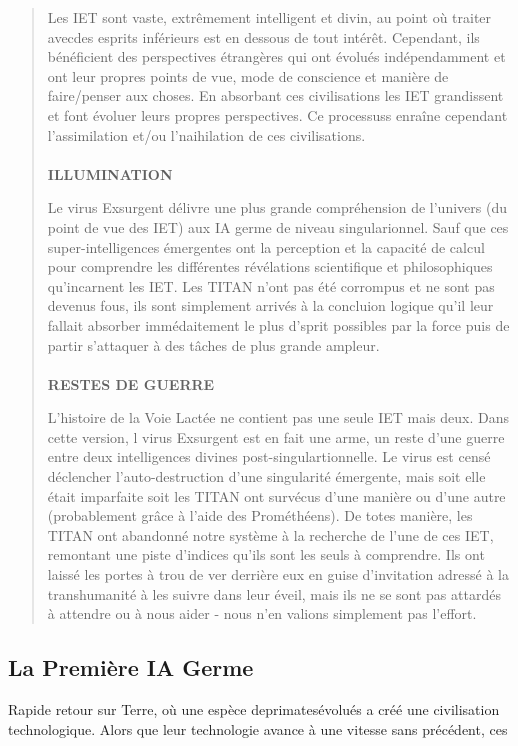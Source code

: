 \begin{quotation}
Les IET sont vaste, extrêmement intelligent et divin, au point où traiter avecdes esprits inférieurs est en dessous de tout intérêt. Cependant, ils bénéficient des perspectives étrangères qui ont évolués indépendamment et ont leur propres points de vue, mode de conscience et manière de faire/penser aux choses. En absorbant ces civilisations les IET grandissent et font évoluer leurs propres perspectives. Ce processuss enraîne cependant l'assimilation et/ou l'naihilation de ces civilisations. \\ \\ \textbf{ILLUMINATION} 

Le virus Exsurgent délivre une plus grande compréhension de l'univers (du point de vue des IET) aux IA germe de niveau singularionnel. Sauf que ces super-intelligences émergentes ont la perception et la capacité de calcul pour comprendre les différentes révélations scientifique et philosophiques qu'incarnent les IET. Les TITAN n'ont pas été corrompus et ne sont pas devenus fous, ils sont simplement arrivés à la concluion logique qu'il leur fallait absorber immédaitement le plus d'sprit possibles par la force puis de partir s'attaquer à des tâches de plus grande ampleur. \\ \\ \textbf{RESTES DE GUERRE} 

L'histoire de la Voie Lactée ne contient pas une seule IET mais deux. Dans cette version, l virus Exsurgent est en fait une arme, un reste d'une guerre entre deux intelligences divines post-singulartionnelle. Le virus est censé déclencher l'auto-destruction d'une singularité émergente, mais soit elle était imparfaite soit les TITAN ont survécus d'une manière ou d'une autre (probablement grâce à l'aide des Prométhéens). De totes manière, les TITAN ont abandonné notre système à la recherche de l'une de ces IET, remontant une piste d'indices qu'ils sont les seuls à comprendre. Ils ont laissé les portes à trou de ver derrière eux en guise d'invitation adressé à la transhumanité à les suivre dans leur éveil, mais ils ne se sont pas attardés à attendre ou à nous aider - nous n'en valions simplement pas l'effort. \end{quotation} 

\subsection{La Première IA Germe} 

Rapide retour sur Terre, où une espèce deprimatesévolués a créé une civilisation technologique. Alors que leur technologie avance à une vitesse sans précédent, ces 

